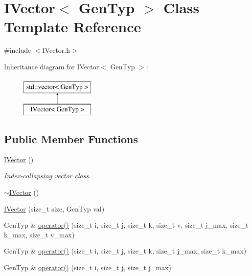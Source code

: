 \hypertarget{class_i_vector}{}\section{I\+Vector$<$ Gen\+Typ $>$ Class Template Reference}
\label{class_i_vector}


{\ttfamily \#include $<$I\+Vector.\+h$>$}

Inheritance diagram for I\+Vector$<$ Gen\+Typ $>$\+:\begin{figure}[H]
\begin{center}
\leavevmode
\includegraphics[height=2.000000cm]{class_i_vector}
\end{center}
\end{figure}
\subsection*{Public Member Functions}
\begin{DoxyCompactItemize}
\item 
\hyperlink{class_i_vector_aa9e08edf18a107b1512c563f974b84a9}{I\+Vector} ()
\begin{DoxyCompactList}\small\item\em Index-\/collapsing vector class. \end{DoxyCompactList}\item 
\hyperlink{class_i_vector_a98498962689499607ff2f3c0dd251c55}{$\sim$\+I\+Vector} ()
\item 
\hyperlink{class_i_vector_aa20ed511fdb06743b435f23bbf286e8c}{I\+Vector} (size\+\_\+t size, Gen\+Typ val)
\item 
Gen\+Typ \& \hyperlink{class_i_vector_aecbb48fdf561c44efb89127c77ab11e2}{operator()} (size\+\_\+t i, size\+\_\+t j, size\+\_\+t k, size\+\_\+t v, size\+\_\+t j\+\_\+max, size\+\_\+t k\+\_\+max, size\+\_\+t v\+\_\+max)
\item 
Gen\+Typ \& \hyperlink{class_i_vector_a975461485fb45bd7e970822800266177}{operator()} (size\+\_\+t i, size\+\_\+t j, size\+\_\+t k, size\+\_\+t j\+\_\+max, size\+\_\+t k\+\_\+max)
\item 
Gen\+Typ \& \hyperlink{class_i_vector_a506334a0add9a0a79e27a208fda53c0d}{operator()} (size\+\_\+t i, size\+\_\+t j, size\+\_\+t j\+\_\+max)
\end{DoxyCompactItemize}


